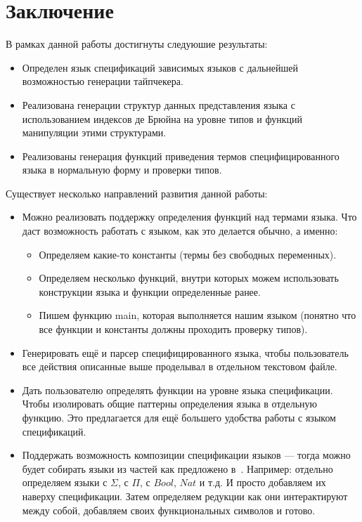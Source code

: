 \documentclass{spbau-diploma}
\begin{document}





\section*{Заключение}

В рамках данной работы достигнуты следуюшие результаты:
\begin{itemize}
  \item Определен язык спецификаций зависимых языков с дальнейшей возможностью генерации тайпчекера.
  \item Реализована генерации структур данных представления языка с использованием индексов де Брюйна на уровне типов и функций манипуляции этими структурами.
  \item Реализованы генерация функций приведения термов специфицированного языка в нормальную форму и проверки типов.
\end{itemize}

Существует несколько направлений развития данной работы:
\begin{itemize}
  \item Можно реализовать поддержку определения функций над термами языка. Что даст возможность работать с языком, как это делается обычно, а именно:
  \begin{itemize}
    \item Определяем какие-то константы (термы без свободных переменных).
    \item Определяем несколько функций, внутри которых можем использовать конструкции языка и функции определенные ранее.
    \item Пишем функцию main, которая выполняется нашим языком (понятно что все функции и константы должны проходить проверку типов).
  \end{itemize}
  \item Генерировать ещё и парсер специфицированного языка, чтобы пользователь все действия описанные выше проделывал в отдельном текстовом файле.
  \item Дать пользователю определять функции на уровне языка спецификации. Чтобы изолировать общие паттерны определения языка в отдельную функцию. Это предлагается для ещё большего удобства работы с языком спецификаций.
  \item Поддержать возможность композиции спецификации языков --- тогда можно будет собирать языки из частей как предложено в~\cite{isaev}. Например: отдельно определяем языки с $\Sigma$, с $\Pi$, с $Bool$, $Nat$ и т.д. И просто добавляем их наверху спецификации. Затем определяем редукции как они интерактируют между собой, добавляем своих функциональных символов и готово.
\end{itemize}






\end{document}
